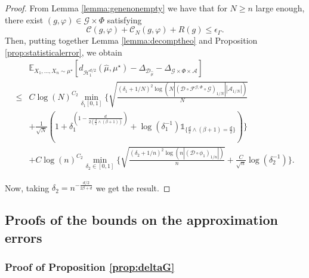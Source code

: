 \documentclass[10pt]{article}
\begin{document}
\begin{proof}
From Lemma \ref{lemma:genenonempty} we have that for $N\geq n$ large enough, there exist $(g,\varphi)\in \mathcal{G}\times  \Phi$ satisfying
    $$\mathcal{C}(g,\varphi) + \mathcal{C}_N(g,\varphi) +R(g)\leq \epsilon_\Gamma.$$ Then, putting together Lemma \ref{lemma:decomptheo} and Proposition \ref{prop:statisticalerror}, we obtain
   \begin{align*}
& \mathbb{E}_{X_1,...,X_n\sim \mu^\star}[d_{\mathcal{H}^{d/2}_1}(\hat{\mu},\mu^\star)-\Delta_{\mathcal{D}_{\hat{\mu}}}-\Delta_{\mathcal{G}\times \Phi \times \mathcal{A}}]\\
 \leq &  C\log(N)^{C_2} \min \limits_{\delta_1 [0,1]}  \Biggl\{ \sqrt{\frac{(\delta_1+1/N)^2\log(N|(\mathcal{D}\circ\mathcal{F}^{\mathcal{G},\Phi}\circ \mathcal{G})_{1/N}||\mathcal{A}_{1/N}|)}{N}}\\
 &+\frac{1}{\sqrt{N}}(1+\delta_1^{(1-\frac{d}{2(\frac{d}{2}\wedge(\beta+1))})}+\log(\delta^{-1}_1)\mathds{1}_{\{\frac{d}{2}\wedge(\beta+1)= \frac{d}{2}\}})\Biggl\}\\
& + C\log(n)^{C_2}\min \limits_{\delta_2 \in [0,1]}  \Biggl\{  \sqrt{\frac{(\delta_2+1/n)^2\log(n|(\mathcal{D} \circ \phi_1)_{1/n}|)}{n}}+\frac{C}{\sqrt{n}}\log(\delta_2^{-1})\Biggl\}.
\end{align*}

Now, taking $\delta_2=n^{-\frac{d/2}{2\beta+d}}$
we get the result.


\end{proof}







\subsection{Proofs of the bounds on the approximation errors}

\subsubsection{Proof of Proposition \ref{prop:deltaG}}\label{sec:prop:deltaG}
\end{document}
